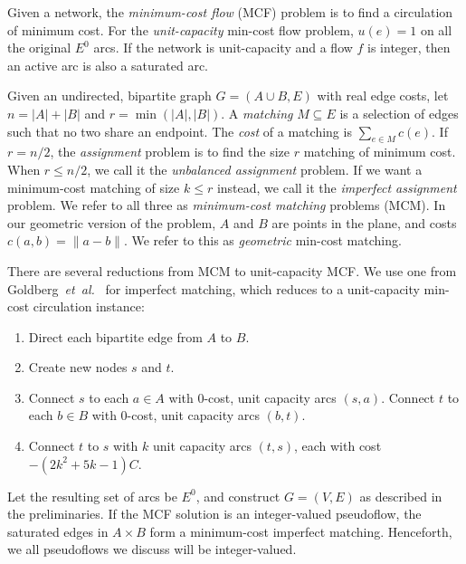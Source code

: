 \documentclass[11pt]{article}
\def\etal{\textsl{et~al.}}
\theoremstyle{plain}
\begin{document}
Given a network, the \emph{minimum-cost flow} (MCF) problem 
is to find a circulation of minimum cost.
For the \emph{unit-capacity} min-cost flow problem, 
$u(e) = 1$ on all the original $E^0$ arcs.
If the network is unit-capacity and a flow $f$ is integer,
then an active arc is also a saturated arc.

Given an undirected, bipartite graph $G = (A\cup B, E)$
with real edge costs, let $n = |A| + |B|$ and $r = \min(|A|, |B|)$.
A \emph{matching} $M \subseteq E$ is a selection of edges
such that no two share an endpoint.
The \emph{cost} of a matching is $\sum_{e \in M} c(e)$.
If $r = n/2$, the \emph{assignment} problem is to find the size $r$ matching of minimum cost.
When $r \leq n/2$, we call it the \emph{unbalanced assignment} problem.
If we want a minimum-cost matching of size $k \leq r$ instead,
we call it the \emph{imperfect assignment} problem.
We refer to all three as \emph{minimum-cost matching} problems (MCM).
In our geometric version of the problem, $A$ and $B$ are points in the plane, 
and costs $c(a, b) = \|a - b\|$.
We refer to this as \emph{geometric} min-cost matching.

There are several reductions from MCM to unit-capacity MCF.
We use one from Goldberg~{\etal}~\cite{DBLP:journals/mst/GoldbergHKT17}
for imperfect matching, which reduces to a unit-capacity min-cost circulation instance:
\begin{enumerate}
\item Direct each bipartite edge from $A$ to $B$.
\item Create new nodes $s$ and $t$.
\item Connect $s$ to each $a \in A$ with 0-cost, unit capacity arcs $(s, a)$.
	Connect $t$ to each $b \in B$ with 0-cost, unit capacity arcs $(b, t)$.
\item Connect $t$ to $s$ with $k$ unit capacity arcs $(t, s)$, 
	each with cost $-(2k^2 + 5k - 1)C$.
\end{enumerate}
Let the resulting set of arcs be $E^0$, 
and construct $G = (V, E)$ as described in the preliminaries.
If the MCF solution is an integer-valued pseudoflow, 
the saturated edges in $A \times B$ form a minimum-cost imperfect matching.
Henceforth, we all pseudoflows we discuss will be integer-valued.
\end{document}
